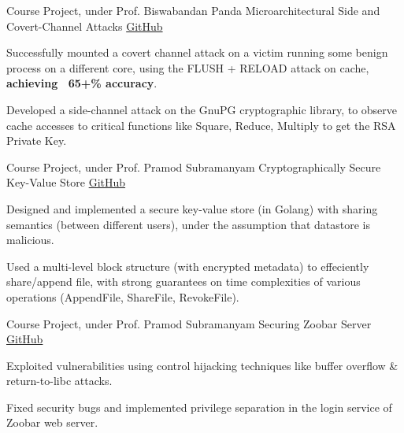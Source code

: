 \begin{cventries}


  \cventry
  {Course Project, under Prof. Biswabandan Panda}
  {Microarchitectural Side and Covert-Channel Attacks}
  {}
  {\href{https://github.com/mayanksha/clflush\_attack}{\faGithubSquare\acvHeaderIconSep GitHub}}
  {
    \begin{cvitems}
        \item Successfully mounted a covert channel attack on a victim running some benign process on a different core, using the FLUSH + RELOAD attack on cache, \textbf{achieving ~65+\% accuracy}.
        \item Developed a side-channel attack on the GnuPG cryptographic library, to observe cache accesses to critical functions like Square, Reduce, Multiply to get the RSA Private Key.
    \end{cvitems}
  }

  \cventry
  {Course Project, under Prof. Pramod Subramanyam}
  {Cryptographically Secure Key-Value Store}
  {\href{https://github.com/mayanksha/crypt-key-value-store}{\faGithubSquare\acvHeaderIconSep GitHub}}
  {}
  {
    \begin{cvitems}
    \item Designed and implemented a secure key-value store (in Golang) with sharing semantics (between different users), under the assumption that datastore is malicious.
    \item Used a multi-level block structure (with encrypted metadata) to effeciently share/append file, with strong guarantees on time complexities of various operations (AppendFile, ShareFile, RevokeFile).
    \end{cvitems}
  }

  \cventry
  {Course Project, under Prof. Pramod Subramanyam}
  {Securing Zoobar Server}
  {\href{https://github.com/mayanksha/CS628}{\faGithubSquare\acvHeaderIconSep GitHub}}
  {}
  {
    \begin{cvitems}
    \item Exploited vulnerabilities using control hijacking techniques like buffer overflow \& return-to-libc attacks.
        \item Fixed security bugs and implemented privilege separation in the login service of Zoobar web server.
    \end{cvitems}
  }


\end{cventries}
